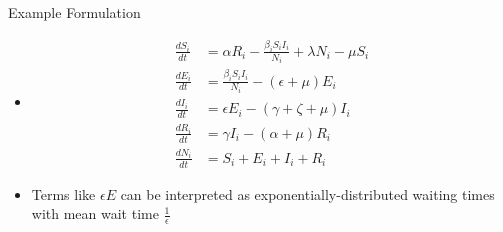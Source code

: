 \documentclass{beamer}
\begin{document}

\begin{frame}{Example Formulation}
    \begin{itemize}
    \item[] \begin{align*}
    \frac{dS_{i}}{dt} &= \alpha R_{i} - \frac{\beta_{i} S_{i} I_{i}}{N_{i}} + \lambda N_{i} - \mu S_{i}\\
    \frac{dE_{i}}{dt} &= \frac{\beta_{i} S_{i} I_{i}}{N_{i}} - (\epsilon + \mu ) E_{i}\\
    \frac{dI_{i}}{dt} &= \epsilon E_{i} - (\gamma + \zeta + \mu)I_{i}\\
    \frac{dR_{i}}{dt} &= \gamma I_{i} - (\alpha + \mu)R_{i}\\
    \frac{dN_{i}}{dt} &= S_{i} + E_{i} + I_{i} + R_{i}
    \end{align*}
    \item Terms like $\epsilon E$ can be interpreted as exponentially-distributed waiting times with mean wait time $\frac{1}{\epsilon}$
   \end{itemize}
\end{frame}
\end{document}
